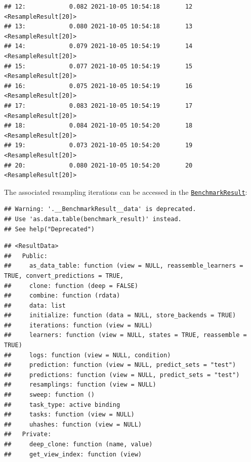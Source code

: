 \documentclass[
]{scrbook}
\newenvironment{Shaded}{\begin{snugshade}}{\end{snugshade}}
\newcommand{\NormalTok}[1]{#1}
\newcommand{\SpecialCharTok}[1]{\textcolor[rgb]{0.00,0.00,0.00}{#1}}
\renewenvironment{Shaded} {\begin{snugshade}\small} {\end{snugshade}}
\begin{document}
\begin{verbatim}
## 12:            0.082 2021-10-05 10:54:18       12 <ResampleResult[20]>
## 13:            0.080 2021-10-05 10:54:18       13 <ResampleResult[20]>
## 14:            0.079 2021-10-05 10:54:19       14 <ResampleResult[20]>
## 15:            0.077 2021-10-05 10:54:19       15 <ResampleResult[20]>
## 16:            0.075 2021-10-05 10:54:19       16 <ResampleResult[20]>
## 17:            0.083 2021-10-05 10:54:19       17 <ResampleResult[20]>
## 18:            0.084 2021-10-05 10:54:20       18 <ResampleResult[20]>
## 19:            0.073 2021-10-05 10:54:20       19 <ResampleResult[20]>
## 20:            0.080 2021-10-05 10:54:20       20 <ResampleResult[20]>
\end{verbatim}

The associated resampling iterations can be accessed in the \href{https://mlr3.mlr-org.com/reference/BenchmarkResult.html}{\texttt{BenchmarkResult}}:

\begin{Shaded}
\end{Shaded}

\begin{verbatim}
## Warning: '.__BenchmarkResult__data' is deprecated.
## Use 'as.data.table(benchmark_result)' instead.
## See help("Deprecated")
\end{verbatim}

\begin{verbatim}
## <ResultData>
##   Public:
##     as_data_table: function (view = NULL, reassemble_learners = TRUE, convert_predictions = TRUE, 
##     clone: function (deep = FALSE) 
##     combine: function (rdata) 
##     data: list
##     initialize: function (data = NULL, store_backends = TRUE) 
##     iterations: function (view = NULL) 
##     learners: function (view = NULL, states = TRUE, reassemble = TRUE) 
##     logs: function (view = NULL, condition) 
##     prediction: function (view = NULL, predict_sets = "test") 
##     predictions: function (view = NULL, predict_sets = "test") 
##     resamplings: function (view = NULL) 
##     sweep: function () 
##     task_type: active binding
##     tasks: function (view = NULL) 
##     uhashes: function (view = NULL) 
##   Private:
##     deep_clone: function (name, value) 
##     get_view_index: function (view)
\end{verbatim}
\end{document}
